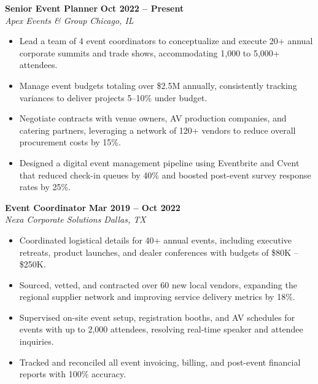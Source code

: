 \documentclass{article}
\begin{document}
\noindent\textbf{\color{primaryColor}Senior Event Planner} \hfill \textbf{Oct 2022 -- Present}\\{}
\noindent\textit{Apex Events \& Group} \hfill \textit{Chicago, IL}\par
\vspace{3pt}
\begin{itemize}
  \item Lead a team of 4 event coordinators to conceptualize and execute 20+ annual corporate summits and trade shows, accommodating 1,000 to 5,000+ attendees.
  \item Manage event budgets totaling over \$2.5M annually, consistently tracking variances to deliver projects 5--10\% under budget.
  \item Negotiate contracts with venue owners, AV production companies, and catering partners, leveraging a network of 120+ vendors to reduce overall procurement costs by 15\%.
  \item Designed a digital event management pipeline using Eventbrite and Cvent that reduced check-in queues by 40\% and boosted post-event survey response rates by 25\%.
\end{itemize}

\vspace{8pt}

\noindent\textbf{\color{primaryColor}Event Coordinator} \hfill \textbf{Mar 2019 -- Oct 2022}\\{}
\noindent\textit{Nexa Corporate Solutions} \hfill \textit{Dallas, TX}\par
\vspace{3pt}
\begin{itemize}
  \item Coordinated logistical details for 40+ annual events, including executive retreats, product launches, and dealer conferences with budgets of \$80K -- \$250K.
  \item Sourced, vetted, and contracted over 60 new local vendors, expanding the regional supplier network and improving service delivery metrics by 18\%.
  \item Supervised on-site event setup, registration booths, and AV schedules for events with up to 2,000 attendees, resolving real-time speaker and attendee inquiries.
  \item Tracked and reconciled all event invoicing, billing, and post-event financial reports with 100\% accuracy.
\end{itemize}

\vspace{8pt}
\end{document}

